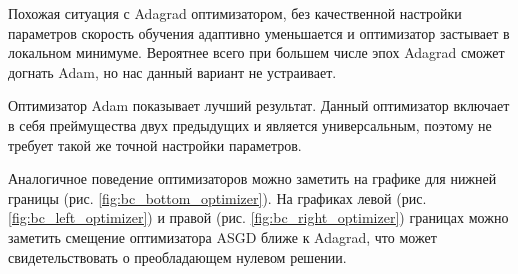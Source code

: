 Похожая ситуация с Adagrad оптимизатором, без качественной
настройки параметров скорость обучения адаптивно уменьшается
и оптимизатор застывает в локальном минимуме. Вероятнее всего
при большем числе эпох Adagrad сможет догнать Adam, но нас
данный вариант не устраивает.

Оптимизатор Adam показывает лучший результат. Данный оптимизатор
включает в себя преймущества двух предыдущих и является универсальным,
поэтому не требует такой же точной настройки параметров.

Аналогичное поведение оптимизаторов можно заметить на графике для нижней
границы (рис. \ref{fig:bc_bottom_optimizer}). На графиках левой
(рис. \ref{fig:bc_left_optimizer}) и правой (рис. \ref{fig:bc_right_optimizer})
границах можно заметить смещение оптимизатора ASGD ближе к Adagrad, что может
свидетельствовать о преобладающем нулевом решении.


